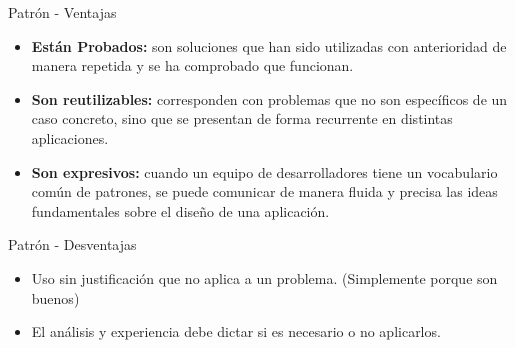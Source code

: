 \begin{frame}{Patr\'on - Ventajas}
	\begin{itemize}
		\item \textbf{Están Probados:} son soluciones que han sido utilizadas con anterioridad de manera
		repetida y se ha comprobado que funcionan.
		\item \textbf{Son reutilizables:} corresponden con problemas que no son espec\'ificos de un caso
		concreto, sino que se presentan de forma recurrente en distintas aplicaciones.
		\item \textbf{Son expresivos:} cuando un equipo de desarrolladores tiene un vocabulario com\'un de
		patrones, se puede comunicar de manera fluida y precisa las ideas fundamentales sobre
		el dise\~no de una aplicaci\'on.
	\end{itemize}
\end{frame}

\begin{frame}{Patr\'on - Desventajas}
	\begin{itemize}
		\item Uso sin justificaci\'on que no aplica a un problema. (Simplemente porque son buenos)
		\item El an\'alisis y experiencia debe dictar si es necesario o no aplicarlos.
	\end{itemize}
\end{frame}



%
